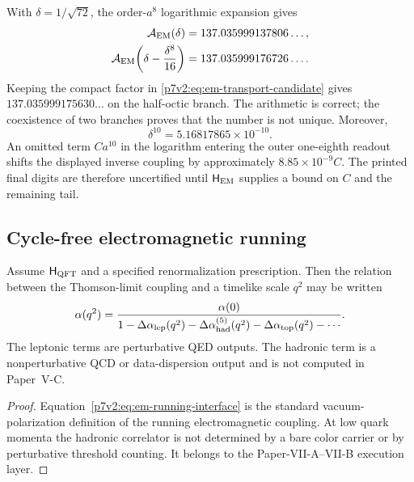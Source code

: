 \documentclass[12pt,a4paper]{article}
\newcommand{\Hqft}{\mathsf{H}_{\rm QFT}}
\newcommand{\Hem}{\mathsf{H}_{\rm EM}}
\newcommand{\Aem}{\mathcal A_{\rm EM}}
\begin{document}
\begin{remark}
\label{p7v2:rem:em-numerics}
With \(\delta=1/\sqrt{72}\), the order-\(a^8\) logarithmic expansion gives
\begin{align}
 \Aem(\delta)
 &=137.035999137806\ldots,\\
 \Aem\!\left(\delta-\frac{\delta^8}{16}\right)
 &=137.035999176726\ldots.
\end{align}
Keeping the compact factor in
\eqref{p7v2:eq:em-transport-candidate} gives
\(137.035999175630\ldots\) on the half-octic branch.  The arithmetic is
correct; the coexistence of two branches proves that the number is not unique.
Moreover,
\[
 \delta^{10}=5.16817865\times10^{-10}.
\]
An omitted term \(C a^{10}\) in the logarithm entering the outer
one-eighth readout shifts the displayed inverse coupling by approximately
\(8.85\times10^{-9}C\).  The printed final digits are therefore uncertified
until \(\Hem\) supplies a bound on \(C\) and the remaining tail.
\end{remark}

\subsection{Cycle-free electromagnetic running}
\label{p7v2:sec:em-running}

\begin{proposition}
\label{p7v2:prop:em-running-interface}
Assume \(\Hqft\) and a specified renormalization prescription.  Then the
relation between the Thomson-limit coupling and a timelike scale \(q^2\) may
be written
\begin{equation}
\label{p7v2:eq:em-running-interface}
 \alpha(q^2)
 =
 \frac{\alpha(0)}
 {1-\Delta\alpha_{\rm lep}(q^2)
    -\Delta\alpha_{\rm had}^{(5)}(q^2)
    -\Delta\alpha_{\rm top}(q^2)
    -\cdots}.
\end{equation}
The leptonic terms are perturbative QED outputs.  The hadronic term is a
nonperturbative QCD or data-dispersion output and is not computed in
Paper~V-C.
\end{proposition}

\begin{proof}
Equation~\eqref{p7v2:eq:em-running-interface} is the standard
vacuum-polarization definition of the running electromagnetic coupling.  At
low quark momenta the hadronic correlator is not determined by a bare color
carrier or by perturbative threshold counting.  It belongs to the
Paper-VII-A--VII-B execution layer.
\end{proof}
\end{document}
